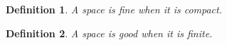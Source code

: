 \documentclass{article}
\newtheorem{definition}{Definition}
\begin{document}
\begin{definition} A space is fine when it is compact. \end{definition}
\begin{definition} A space is good when it is finite. \end{definition}
\end{document}
